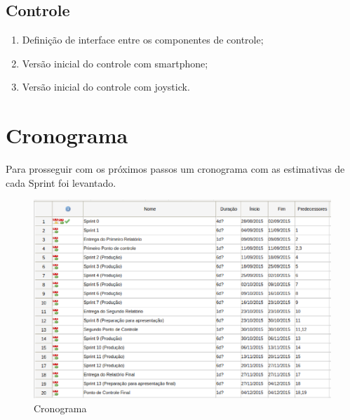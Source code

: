   \subsection{Controle}
    \begin{enumerate}
     \item Definição de interface entre os componentes de controle;
     \item Versão inicial do controle com smartphone;
     \item Versão inicial do controle com joystick.
    \end{enumerate}

\section{Cronograma}

  Para prosseguir com os próximos passos um cronograma com as estimativas de cada Sprint foi levantado.

  \begin{figure}[!htb]
  \centering
    \includegraphics[keepaspectratio=true,scale=0.5]{figuras/metodologia/cronograma}
  \caption{Cronograma}
  \label{fig:cronograma}
  \end{figure}
